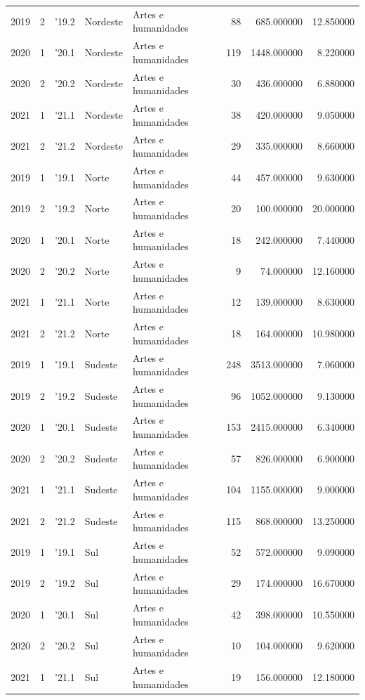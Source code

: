 \begin{longtable}{rrlllrrr}
2019 & 2 & '19.2 & Nordeste & Artes e humanidades & 88 & 685.000000 & 12.850000 \\
2020 & 1 & '20.1 & Nordeste & Artes e humanidades & 119 & 1448.000000 & 8.220000 \\
2020 & 2 & '20.2 & Nordeste & Artes e humanidades & 30 & 436.000000 & 6.880000 \\
2021 & 1 & '21.1 & Nordeste & Artes e humanidades & 38 & 420.000000 & 9.050000 \\
2021 & 2 & '21.2 & Nordeste & Artes e humanidades & 29 & 335.000000 & 8.660000 \\
2019 & 1 & '19.1 & Norte & Artes e humanidades & 44 & 457.000000 & 9.630000 \\
2019 & 2 & '19.2 & Norte & Artes e humanidades & 20 & 100.000000 & 20.000000 \\
2020 & 1 & '20.1 & Norte & Artes e humanidades & 18 & 242.000000 & 7.440000 \\
2020 & 2 & '20.2 & Norte & Artes e humanidades & 9 & 74.000000 & 12.160000 \\
2021 & 1 & '21.1 & Norte & Artes e humanidades & 12 & 139.000000 & 8.630000 \\
2021 & 2 & '21.2 & Norte & Artes e humanidades & 18 & 164.000000 & 10.980000 \\
2019 & 1 & '19.1 & Sudeste & Artes e humanidades & 248 & 3513.000000 & 7.060000 \\
2019 & 2 & '19.2 & Sudeste & Artes e humanidades & 96 & 1052.000000 & 9.130000 \\
2020 & 1 & '20.1 & Sudeste & Artes e humanidades & 153 & 2415.000000 & 6.340000 \\
2020 & 2 & '20.2 & Sudeste & Artes e humanidades & 57 & 826.000000 & 6.900000 \\
2021 & 1 & '21.1 & Sudeste & Artes e humanidades & 104 & 1155.000000 & 9.000000 \\
2021 & 2 & '21.2 & Sudeste & Artes e humanidades & 115 & 868.000000 & 13.250000 \\
2019 & 1 & '19.1 & Sul & Artes e humanidades & 52 & 572.000000 & 9.090000 \\
2019 & 2 & '19.2 & Sul & Artes e humanidades & 29 & 174.000000 & 16.670000 \\
2020 & 1 & '20.1 & Sul & Artes e humanidades & 42 & 398.000000 & 10.550000 \\
2020 & 2 & '20.2 & Sul & Artes e humanidades & 10 & 104.000000 & 9.620000 \\
2021 & 1 & '21.1 & Sul & Artes e humanidades & 19 & 156.000000 & 12.180000 \\

\end{longtable}
